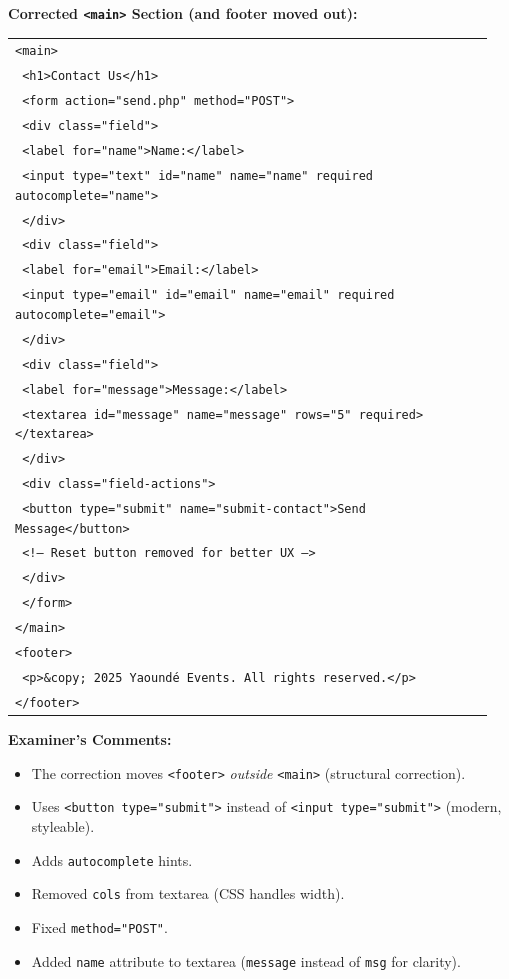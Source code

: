 \documentclass[11pt]{article}
\begin{document}
\begin{exoresolu}
\textbf{Corrected \texttt{<main>} Section (and footer moved out):}
\begin{center}
\begin{tabular}{|p{0.95\linewidth}|}\hline
\texttt{<main>}\\
\texttt{  <h1>Contact Us</h1>}\\
\texttt{  <form action="send.php" method="POST">}\\
\texttt{    <div class="field">}\\
\texttt{      <label for="name">Name:</label>}\\
\texttt{      <input type="text" id="name" name="name" required autocomplete="name">}\\
\texttt{    </div>}\\
\texttt{    <div class="field">}\\
\texttt{      <label for="email">Email:</label>}\\
\texttt{      <input type="email" id="email" name="email" required autocomplete="email">}\\
\texttt{    </div>}\\
\texttt{    <div class="field">}\\
\texttt{      <label for="message">Message:</label>}\\
\texttt{      <textarea id="message" name="message" rows="5" required></textarea>}\\
\texttt{    </div>}\\
\texttt{    <div class="field-actions">}\\
\texttt{      <button type="submit" name="submit-contact">Send Message</button>}\\
\texttt{      <!-- Reset button removed for better UX -->}\\
\texttt{    </div>}\\
\texttt{  </form>}\\
\texttt{</main>}\\
\texttt{<footer>}\\
\texttt{  <p>\&copy; 2025 Yaoundé Events. All rights reserved.</p>}\\
\texttt{</footer>}\\\hline
\end{tabular}
\end{center}

\textbf{Examiner's Comments:}
\begin{itemize}
    \item The correction moves \texttt{<footer>} \emph{outside} \texttt{<main>} (structural correction).
    \item Uses \texttt{<button type="submit">} instead of \texttt{<input type="submit">} (modern, styleable).
    \item Adds \texttt{autocomplete} hints.
    \item Removed \texttt{cols} from textarea (CSS handles width).
    \item Fixed \texttt{method="POST"}.
    \item Added \texttt{name} attribute to textarea (\texttt{message} instead of \texttt{msg} for clarity).
\end{itemize}
\end{exoresolu}
\end{document}
